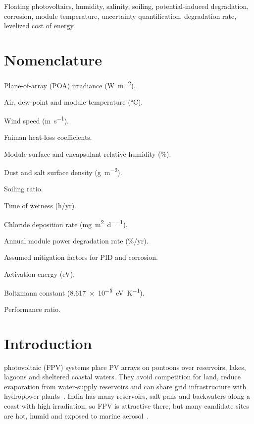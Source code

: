 \documentclass[journal]{IEEEtran}
\newcommand{\RHs}{\mathit{RH}_{\mathrm{s}}}
\newcommand{\RHe}{\mathit{RH}_{\mathrm{e}}}
\newcommand{\TOWsym}{\mathit{TOW}}
\begin{document}
\begin{IEEEkeywords}
Floating photovoltaics, humidity, salinity, soiling, potential-induced degradation, corrosion, module temperature,
uncertainty quantification, degradation rate, levelized cost of energy.
\end{IEEEkeywords}

\section*{Nomenclature}
\begin{IEEEdescription}
\item[$G$] Plane-of-array (POA) irradiance (\si{\watt\per\square\metre}).
\item[$T_a, T_d, T_m$] Air, dew-point and module temperature (\si{\celsius}).
\item[$v$] Wind speed (\si{\metre\per\second}).
\item[$U_0, U_1$] Faiman heat-loss coefficients.
\item[$\RHs, \RHe$] Module-surface and encapsulant relative humidity (\%).
\item[$m_d, m_s$] Dust and salt surface density (\si{\gram\per\square\metre}).
\item[$\mathit{SR}$] Soiling ratio.
\item[$\TOWsym$] Time of wetness (h/yr).
\item[$D_{\mathrm{Cl}}$] Chloride deposition rate (\si{\milli\gram\per\square\metre\per\day}).
\item[$R$] Annual module power degradation rate (\%/yr).
\item[$\mu_{\mathrm{PID}}, \mu_{\mathrm{C}}$] Assumed mitigation factors for PID and corrosion.
\item[$E_a$] Activation energy (eV).
\item[$k_B$] Boltzmann constant (\SI{8.617e-5}{\electronvolt\per\kelvin}).
\item[PR] Performance ratio.
\end{IEEEdescription}

\section{Introduction}
 photovoltaic (FPV) systems place PV arrays on pontoons over reservoirs, lakes, lagoons and
sheltered coastal waters. They avoid competition for land, reduce evaporation from water-supply reservoirs and can share
grid infrastructure with hydropower plants~\cite{worldbank2019,sahu2016,trapani2015,oliveirapinto2020,kumar2021}. India
has many reservoirs, salt pans and backwaters along a coast with high irradiation, so FPV is attractive there, but many
candidate sites are hot, humid and exposed to marine aerosol~\cite{makhija2023}.
\end{document}
